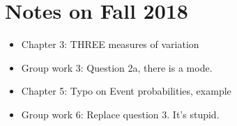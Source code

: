 \documentclass{article}
\begin{document}
\section{Notes on Fall 2018}

\begin{itemize}
\item Chapter 3: THREE measures of variation

\item Group work 3: Question 2a, there is a mode.

\item Chapter 5: Typo on Event probabilities, example

\item Group work 6: Replace question 3. It's stupid.


\end{itemize}
\end{document}
